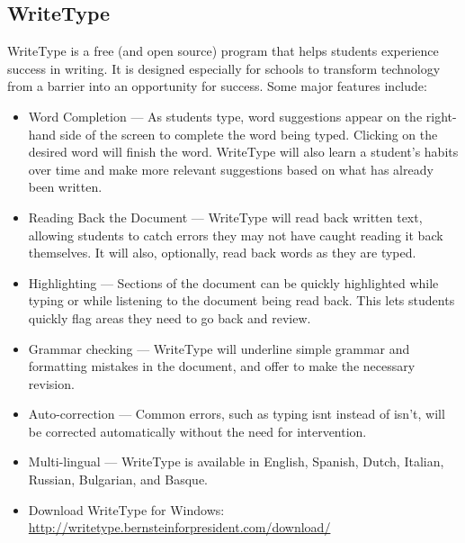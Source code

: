 \documentclass[letterpaper,10pt,english]{sphinxmanual}
\begin{document}
\subsection{WriteType}
\label{resources:writetype}
WriteType is a free (and open source) program that helps students experience success in writing.  It is designed especially for schools to transform technology from a barrier into an opportunity for success.  Some major features include:
\begin{itemize}
\item {} 
Word Completion — As students type, word suggestions appear on the right-hand side of the screen to complete the word being typed.  Clicking on the desired word will finish the word.  WriteType will also learn a student’s habits over time and make more relevant suggestions based on what has already been written.

\item {} 
Reading Back the Document — WriteType will read back written text, allowing students to catch errors they may not have caught reading it back themselves. It will also, optionally, read back words as they are typed.

\item {} 
Highlighting — Sections of the document can be quickly highlighted while typing or while listening to the document being read back. This lets students quickly flag areas they need to go back and review.

\item {} 
Grammar checking — WriteType will underline simple grammar and formatting mistakes in the document, and offer to make the necessary revision.

\item {} 
Auto-correction — Common errors, such as typing isnt instead of isn’t, will be corrected automatically without the need for intervention.

\item {} 
Multi-lingual — WriteType is available in English, Spanish, Dutch, Italian, Russian, Bulgarian, and Basque.

\item {} 
Download WriteType for Windows: \href{http://writetype.bernsteinforpresident.com/download/}{http://writetype.bernsteinforpresident.com/download/}

\end{itemize}
\end{document}
